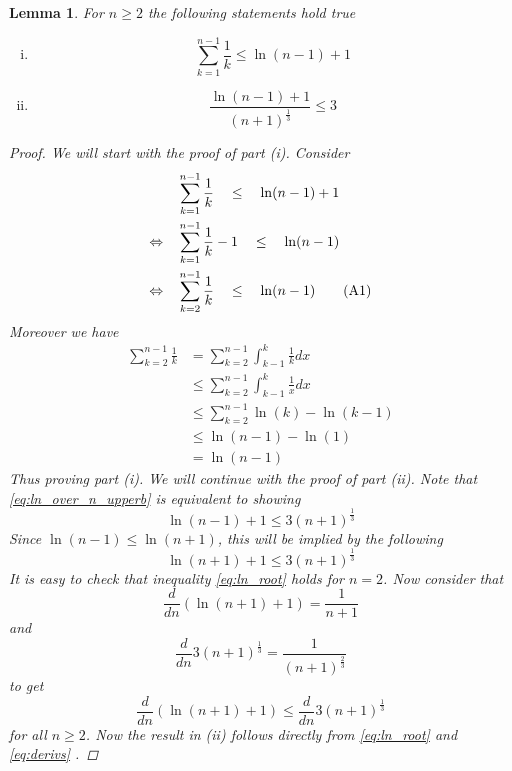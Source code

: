 \documentclass[phd]{UWMThesis}
\newcommand\numberthis{\addtocounter{equation}{1}\tag{\theequation}}
\renewcommand{\.}{\textrm{ .}}
\newtheorem{lemma}[thm]{Lemma}
\theoremstyle{definition}
\numberwithin{thm}{chapter}
\begin{document}
	\begin{lemma} \label{lem:bounds}
		For $n\geq 2$ the following statements hold true
		\begin{enumerate}[(i)]
			\item \begin{equation}
			\sum_{k=1}^{n-1} \frac{1}{k} \leq \ln(n-1) + 1
			\label{eq:sum_ln}
			\end{equation}
			\item \begin{equation}
			\frac{\ln(n-1)+1}{(n+1)^{\frac{1}{3}}} \leq 3
			\label{eq:ln_over_n_upperb}
			\end{equation}
		\end{enumerate}
		\begin{proof}
			We will start with the proof of part (i). Consider 
			\begin{align*}
			& \quad\sum_{k=1}^{n-1} \frac{1}{k} \quad \leq \quad  \ln(n-1) + 1 \\
			\Leftrightarrow & \quad \sum_{k=1}^{n-1} \frac{1}{k} - 1 \quad \leq \quad  \ln(n-1)\\
			\Leftrightarrow & \quad \sum_{k=2}^{n-1} \frac{1}{k} \quad \leq \quad  \ln(n-1)
			\numberthis\label{eq:prodexp}
			\end{align*}
			Moreover we have
			\begin{align*}
			\sum_{k=2}^{n-1} \frac{1}{k} &= \sum_{k=2}^{n-1} \int_{k-1}^{k}\frac{1}{k} dx\\
			&\leq \sum_{k=2}^{n-1} \int_{k-1}^{k}\frac{1}{x} dx\\
			&\leq \sum_{k=2}^{n-1} \ln(k) - \ln(k-1)\\
			&\leq \ln(n-1) - \ln(1)\\
			&= \ln(n-1)
			\end{align*}
			Thus proving part (i). 
			We will continue with the proof of part (ii). Note that \eqref{eq:ln_over_n_upperb} is equivalent to showing 
			\begin{equation*}
			\ln(n-1)+1 \leq 3(n+1)^{\frac{1}{3}}
			\end{equation*}
			Since $\ln(n-1)\leq \ln(n+1)$, this will be implied by the following
			\begin{equation}
			\ln(n+1)+1 \leq 3(n+1)^{\frac{1}{3}}
			\label{eq:ln_root}
			\end{equation}
			It is easy to check that inequality \eqref{eq:ln_root} holds for $n=2$. Now consider that 
			$$\frac{d}{dn}(\ln(n+1)+1) = \frac{1}{n+1}$$
			and
			$$\frac{d}{dn} 3(n+1)^\frac{1}{3} = \frac{1}{(n+1)^\frac{2}{3}}$$
			to get
			\begin{equation}
			\frac{d}{dn}(\ln(n+1)+1) \leq \frac{d}{dn} 3(n+1)^\frac{1}{3}
			\label{eq:derivs}
			\end{equation}	
			for all $n\geq 2$. Now the result in (ii) follows directly from \eqref{eq:ln_root} and \eqref{eq:derivs} .
		\end{proof}
	\end{lemma}
%
\end{document}
